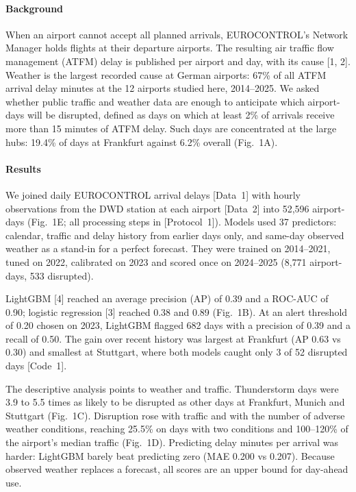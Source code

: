 \documentclass[10pt,a4paper,epsf,apalike]{article}
\begin{document}
\paragraph{Background}
When an airport cannot accept all planned arrivals, EUROCONTROL's Network Manager holds flights at their departure airports. The resulting air traffic flow management (ATFM) delay is published per airport and day, with its cause [1, 2]. Weather is the largest recorded cause at German airports: 67\% of all ATFM arrival delay minutes at the 12 airports studied here, 2014--2025. We asked whether public traffic and weather data are enough to anticipate which airport-days will be disrupted, defined as days on which at least 2\% of arrivals receive more than 15 minutes of ATFM delay. Such days are concentrated at the large hubs: 19.4\% of days at Frankfurt against 6.2\% overall (Fig.~1A).

\paragraph{Results}
We joined daily EUROCONTROL arrival delays [Data~1] with hourly observations from the DWD station at each airport [Data~2] into 52,596 airport-days (Fig.~1E; all processing steps in [Protocol~1]). Models used 37 predictors: calendar, traffic and delay history from earlier days only, and same-day observed weather as a stand-in for a perfect forecast. They were trained on 2014--2021, tuned on 2022, calibrated on 2023 and scored once on 2024--2025 (8,771 airport-days, 533 disrupted).

LightGBM [4] reached an average precision (AP) of 0.39 and a ROC-AUC of 0.90; logistic regression [3] reached 0.38 and 0.89 (Fig.~1B). At an alert threshold of 0.20 chosen on 2023, LightGBM flagged 682 days with a precision of 0.39 and a recall of 0.50. The gain over recent history was largest at Frankfurt (AP 0.63 vs 0.30) and smallest at Stuttgart, where both models caught only 3 of 52 disrupted days [Code~1].

The descriptive analysis points to weather and traffic. Thunderstorm days were 3.9 to 5.5 times as likely to be disrupted as other days at Frankfurt, Munich and Stuttgart (Fig.~1C). Disruption rose with traffic and with the number of adverse weather conditions, reaching 25.5\% on days with two conditions and 100--120\% of the airport's median traffic (Fig.~1D). Predicting delay minutes per arrival was harder: LightGBM barely beat predicting zero (MAE 0.200 vs 0.207). Because observed weather replaces a forecast, all scores are an upper bound for day-ahead use.
\end{document}
